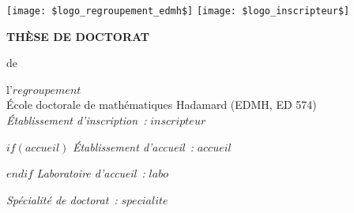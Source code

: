 \documentclass[a4paper,12pt]{reedthesis}
\begin{document}
\thispagestyle{empty}
\vspace{-2cm}

\voffset-10pt


\noindent
\hspace*{-1cm}\hbox{\texttt{[image: \$logo\_regroupement\_edmh\$]}}
\hfill
{}
\hfill
\hbox{\texttt{[image: \$logo\_inscripteur\$]}}
\vspace{7mm}

\begin{center}
{\Large\bf THÈSE DE DOCTORAT}
\end{center}
\begin{center}
{de }
\end{center}
\begin{center}
 {\Large\sc l'$regroupement$}\\
  \vspace*{0.4cm}
École doctorale de mathématiques Hadamard (EDMH, ED 574)\\
 \vspace*{0.4cm}
{\small \it Établissement d'inscription~:} $inscripteur$

 \vspace*{0.2cm}
$if(accueil)$
{\small \it Établissement d'accueil~:} $accueil$

\vspace*{0.2cm}
$endif$
{\small \it Laboratoire d'accueil~:} $labo$

\vspace*{0.2cm}
\end{center}


\begin{center}
{\it Spécialité de doctorat~:} {\large $specialite$}
\end{center}

\vspace{5mm}
\end{document}
